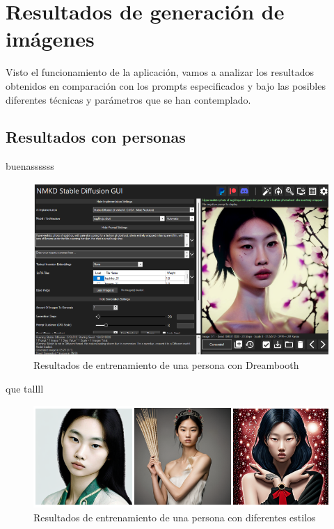 \section{Resultados de generación de imágenes}

Visto el funcionamiento de la aplicación, vamos a analizar los resultados obtenidos en comparación con los prompts especificados y bajo las posibles diferentes técnicas y parámetros que se han contemplado. 


\subsection{Resultados con personas}
buenassssss\\

\begin{figure}[!htb]
	\centering
	\includegraphics[width = 1
	\textwidth]{Imagenes/Vectorial/hoyeon1.png}
	\caption{Resultados de entrenamiento de una persona con Dreambooth}
	\label{fig:hoyeonsd}
\end{figure}

que tallll\\

\begin{figure}[!htb]
	\centering
	\includegraphics[width = 1
	\textwidth]{Imagenes/Vectorial/hoyeon_results.png}
	\caption{Resultados de entrenamiento de una persona con diferentes estilos}
	\label{fig:imagshoyeon}
\end{figure}

